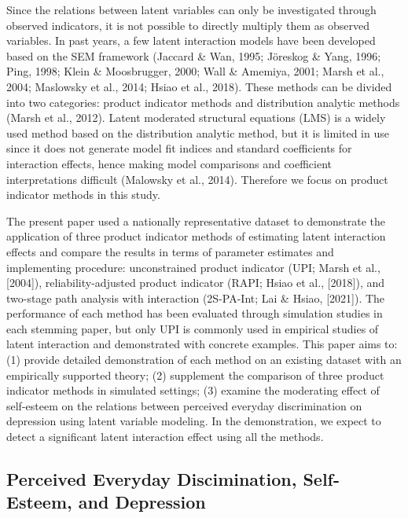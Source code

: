 \documentclass[
  man]{apa7}
\begin{document}
Since the relations between latent variables can only be investigated through observed indicators, it is not possible to directly multiply them as observed variables. In past years, a few latent interaction models have been developed based on the SEM framework (Jaccard \& Wan, 1995; Jöreskog \& Yang, 1996; Ping, 1998; Klein \& Moosbrugger, 2000; Wall \& Amemiya, 2001; Marsh et al., 2004; Maslowsky et al., 2014; Hsiao et al., 2018). These methods can be divided into two categories: product indicator methods and distribution analytic methods (Marsh et al., 2012). Latent moderated structural equations (LMS) is a widely used method based on the distribution analytic method, but it is limited in use since it does not generate model fit indices and standard coefficients for interaction effects, hence making model comparisons and coefficient interpretations difficult (Malowsky et al., 2014). Therefore we focus on product indicator methods in this study.

The present paper used a nationally representative dataset to demonstrate the application of three product indicator methods of estimating latent interaction effects and compare the results in terms of parameter estimates and implementing procedure: unconstrained product indicator (UPI; Marsh et al., {[}2004{]}), reliability-adjusted product indicator (RAPI; Hsiao et al., {[}2018{]}), and two-stage path analysis with interaction (2S-PA-Int; Lai \& Hsiao, {[}2021{]}). The performance of each method has been evaluated through simulation studies in each stemming paper, but only UPI is commonly used in empirical studies of latent interaction and demonstrated with concrete examples. This paper aims to: (1) provide detailed demonstration of each method on an existing dataset with an empirically supported theory; (2) supplement the comparison of three product indicator methods in simulated settings; (3) examine the moderating effect of self-esteem on the relations between perceived everyday discrimination on depression using latent variable modeling. In the demonstration, we expect to detect a significant latent interaction effect using all the methods.

\hypertarget{perceived-everyday-discimination-self-esteem-and-depression}{%
\subsection{Perceived Everyday Discimination, Self-Esteem, and Depression}\label{perceived-everyday-discimination-self-esteem-and-depression}}
\end{document}
